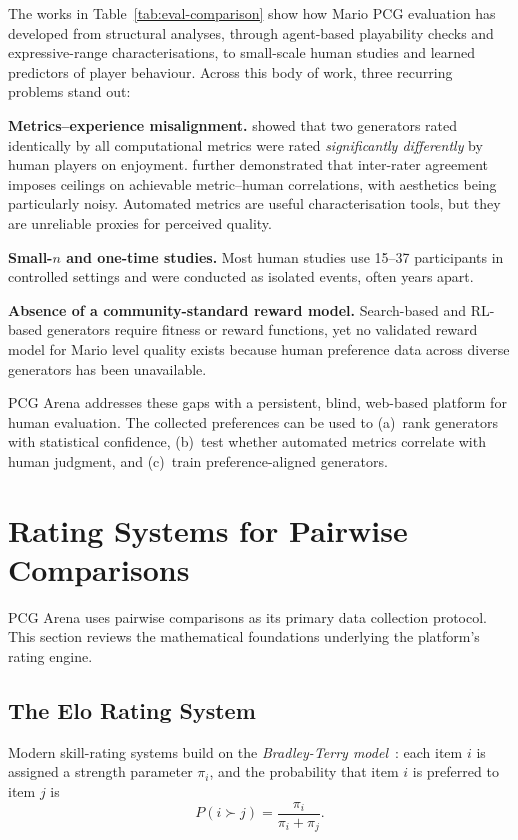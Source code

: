 \documentclass[shortabstract, mgr, english]{iithesis}
\begin{document}
The works in Table~\ref{tab:eval-comparison}
show how Mario PCG evaluation has developed from structural
analyses, through agent-based playability checks and expressive-range
characterisations, to small-scale human studies and learned predictors of
player behaviour. Across this body of work, three recurring problems stand out:

\textbf{Metrics--experience misalignment.} \citet{marino2015empirical} showed
that two generators rated identically by all computational metrics were rated
\emph{significantly differently} by human players on enjoyment.
\citet{summerville2017understanding} further demonstrated that inter-rater
agreement imposes ceilings on achievable metric--human correlations, with
aesthetics being particularly noisy. Automated metrics are useful
characterisation tools, but they are unreliable proxies for perceived quality.

\textbf{Small-$n$ and one-time studies.} Most human studies use 15--37
participants in controlled settings and were conducted as isolated events, often
years apart.

\textbf{Absence of a community-standard reward model.} Search-based and
RL-based generators require fitness or reward functions, yet no validated reward
model for Mario level quality exists because human preference data across diverse generators has been unavailable.

PCG Arena addresses these gaps with a persistent, blind, web-based
platform for human evaluation. The collected preferences can be used to
(a)~rank generators with statistical confidence, (b)~test whether automated
metrics correlate with human judgment, and
(c)~train preference-aligned generators.


\section{Rating Systems for Pairwise Comparisons}
\label{sec:bg-rating}

PCG Arena uses pairwise comparisons as its primary data collection protocol.
This section reviews the mathematical foundations underlying the platform's
rating engine.

\subsection{The Elo Rating System}
\label{subsec:bg-elo}

Modern skill-rating systems build on the \emph{Bradley-Terry
model}~\citep{bradley1952rank}: each item $i$ is assigned a strength parameter
$\pi_i$, and the probability that item $i$ is preferred to item $j$ is
%
\begin{equation}
\label{eq:bt}
P(i \succ j) = \frac{\pi_i}{\pi_i + \pi_j}.
\end{equation}
\end{document}
